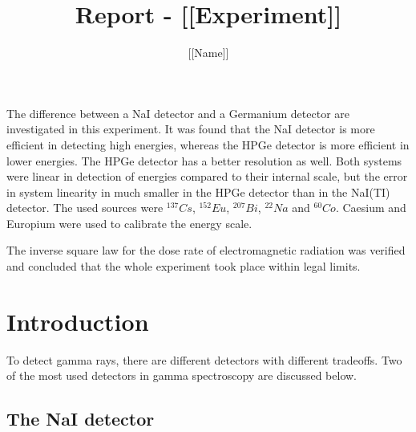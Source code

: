 \documentclass[a4paper]{article}
\author{[[Name]]}
\title{Report - [[Experiment]]}
\begin{document}

\maketitle
\abstract 
The difference between a NaI detector and a Germanium detector are investigated in this experiment. It was found that the NaI detector is more efficient in detecting high energies, whereas the HPGe detector is more efficient in lower energies. The HPGe detector has a better resolution as well. Both systems were linear in detection of energies compared to their internal scale, but the error in system linearity in much smaller in the HPGe detector than in the NaI(TI) detector. The used sources were $^{137}Cs$, $^{152}Eu$, $^{207}Bi$, $^{22}Na$ and $^{60}Co$. Caesium and Europium were used to calibrate the energy scale.

The inverse square law for the dose rate of electromagnetic radiation was verified and concluded that the whole experiment took place within legal limits.

\section{Introduction}

To detect gamma rays, there are different detectors with different tradeoffs. Two of the most used detectors in gamma spectroscopy are discussed below.

\subsection{The NaI detector}
\end{document}
